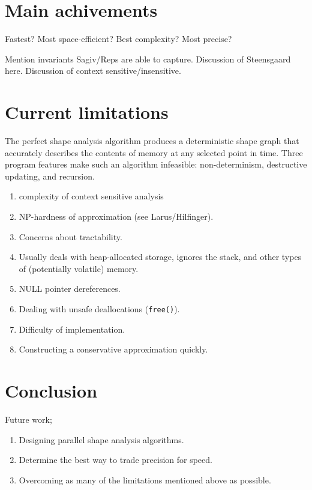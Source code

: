 \documentclass{article}
\begin{document}
\section{Main achivements}

Fastest?
Most space-efficient?
Best complexity?
Most precise?

Mention invariants Sagiv/Reps are able to capture.
Discussion of Steensgaard here.
Discussion of context sensitive/insensitive.

\section{Current limitations}

The perfect shape analysis algorithm produces a deterministic shape graph
that accurately describes the contents of memory at any selected point in
time. Three program features make such an algorithm infeasible:
non-determinism, destructive updating, and recursion. 

\begin{enumerate}[1.]
    \item complexity of context sensitive analysis
    \item NP-hardness of approximation (see Larus/Hilfinger).
    \item Concerns about tractability.
    \item Usually deals with heap-allocated storage, ignores the stack, and
        other types of (potentially volatile) memory.
    \item NULL pointer dereferences.
    \item Dealing with unsafe deallocations (\texttt{free()}).
    \item Difficulty of implementation.
    \item Constructing a conservative approximation quickly.
\end{enumerate}

\section{Conclusion}

Future work;
\begin{enumerate}[1.]
    \item Designing parallel shape analysis algorithms.
    \item Determine the best way to trade precision for speed.
    \item Overcoming as many of the limitations mentioned above as possible.
\end{enumerate}
\end{document}
